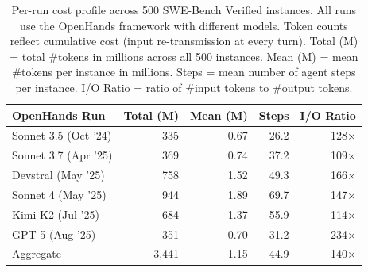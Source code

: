 \begin{table}[t]
\centering
\caption{Per-run cost profile across 500 SWE-Bench Verified instances. All runs use the OpenHands framework with different models. Token counts reflect cumulative cost (input re-transmission at every turn). Total (M) = total \#tokens in millions across all 500 instances. Mean (M) = mean \#tokens per instance in millions. Steps = mean number of agent steps per instance. I/O Ratio = ratio of \#input tokens to \#output tokens.}
\label{tab:rq4-profile}
\begin{tabular}{lrrrr}
\toprule
OpenHands Run & Total (M) & Mean (M) & Steps & I/O Ratio \\
\midrule
Sonnet 3.5 (Oct '24) & 335 & 0.67 & 26.2 & 128$\times$ \\
Sonnet 3.7 (Apr '25) & 369 & 0.74 & 37.2 & 109$\times$ \\
Devstral (May '25) & 758 & 1.52 & 49.3 & 166$\times$ \\
Sonnet 4 (May '25) & 944 & 1.89 & 69.7 & 147$\times$ \\
Kimi K2 (Jul '25) & 684 & 1.37 & 55.9 & 114$\times$ \\
GPT-5 (Aug '25) & 351 & 0.70 & 31.2 & 234$\times$ \\
Aggregate & 3,441 & 1.15 & 44.9 & 140$\times$ \\
\bottomrule
\end{tabular}
\end{table}
